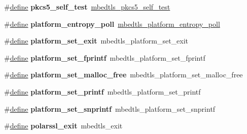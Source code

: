 \begin{DoxyCompactItemize}
\item 
\mbox{\label{compat-1_83_8h_a2f9ccfccd5a3e1a114e27fabcc66da54}} 
\#\hyperlink{structdefine}{define} {\bfseries pkcs5\+\_\+self\+\_\+test}~\hyperlink{pkcs5_8h_a918e7f20c7ad1204980e7ec69869deb3}{mbedtls\+\_\+pkcs5\+\_\+self\+\_\+test}
\item 
\mbox{\label{compat-1_83_8h_a2aca9542b82586e3273dc433b3f26256}} 
\#\hyperlink{structdefine}{define} {\bfseries platform\+\_\+entropy\+\_\+poll}~\hyperlink{entropy__poll_8h_add93967cb361ce9758800ba5a2017528}{mbedtls\+\_\+platform\+\_\+entropy\+\_\+poll}
\item 
\mbox{\label{compat-1_83_8h_a0df6e9c9a79c861a93b257844fb2a2c8}} 
\#\hyperlink{structdefine}{define} {\bfseries platform\+\_\+set\+\_\+exit}~mbedtls\+\_\+platform\+\_\+set\+\_\+exit
\item 
\mbox{\label{compat-1_83_8h_a5b682dc202e4488443f963f441164f0d}} 
\#\hyperlink{structdefine}{define} {\bfseries platform\+\_\+set\+\_\+fprintf}~mbedtls\+\_\+platform\+\_\+set\+\_\+fprintf
\item 
\mbox{\label{compat-1_83_8h_a0316cccad168d561754429525cad2a61}} 
\#\hyperlink{structdefine}{define} {\bfseries platform\+\_\+set\+\_\+malloc\+\_\+free}~mbedtls\+\_\+platform\+\_\+set\+\_\+malloc\+\_\+free
\item 
\mbox{\label{compat-1_83_8h_a741d3700074db753e92b26cee56c603e}} 
\#\hyperlink{structdefine}{define} {\bfseries platform\+\_\+set\+\_\+printf}~mbedtls\+\_\+platform\+\_\+set\+\_\+printf
\item 
\mbox{\label{compat-1_83_8h_a8da1060a8ce014082df67d529d799a77}} 
\#\hyperlink{structdefine}{define} {\bfseries platform\+\_\+set\+\_\+snprintf}~mbedtls\+\_\+platform\+\_\+set\+\_\+snprintf
\item 
\mbox{\label{compat-1_83_8h_a66a39dbfa7ce1de12846d781ac41b146}} 
\#\hyperlink{structdefine}{define} {\bfseries polarssl\+\_\+exit}~mbedtls\+\_\+exit
\item 
\mbox{\label{compat-1_83_8h_a1cf50644470132d69e084ce34f4182fe}} 

\end{DoxyCompactItemize}
